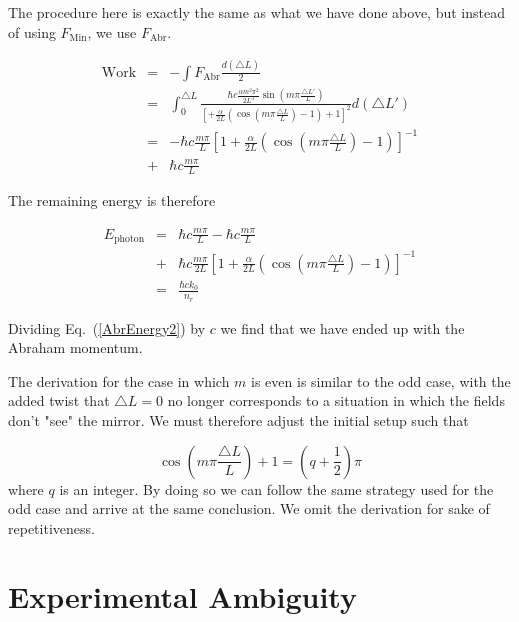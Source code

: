 \documentclass[twocolumn,english,pra,aps,superscriptaddress,floatfix]{revtex4-1}
\begin{document}
The procedure here is exactly the same as what we have done above, but instead of using $F_{\mathrm{Min}}$, we use $F_{\mathrm{Abr}}$.


\begin{eqnarray}
\mathrm{Work}&=&-\int F_{\mathrm{Abr}}\frac{d\left(\triangle L\right)}{2}\nonumber \\
&=&\int_{0}^{\triangle L}\frac{\hbar c\frac{\alpha m^{2}\pi^{2}}{2L^{3}}\sin(m\pi\frac{\triangle L'}{L})}{\left[+\frac{\alpha}{2L}\left(\cos(m\pi\frac{\triangle L}{L})-1\right)+1\right]^{2}}d\left(\triangle L'\right) \nonumber \\
&=&-\hbar c\frac{m\pi}{L}\left[1+\frac{\alpha}{2L}\left(\cos(m\pi\frac{\triangle L}{L})-1\right)\right]^{-1} \nonumber \\
&+&\hbar c\frac{m\pi}{L}
\label{AbrEnergy1}
\end{eqnarray}


The remaining energy is therefore

\begin{eqnarray}
E_{\mathrm{photon}}&=&\hbar c\frac{m\pi}{L} -\hbar c\frac{m\pi}{L}\nonumber \\
&+&\hbar c\frac{m\pi}{2L}\left[1+\frac{\alpha}{2L}\left(\cos(m\pi\frac{\triangle L}{L})-1\right)\right]^{-1}\nonumber \\
&=&\frac{\hbar ck_{0}}{n_{r}}
\label{AbrEnergy2}
\end{eqnarray}


Dividing Eq.\ (\ref{AbrEnergy2}) by $c$ we find that we have ended up with the Abraham momentum.

The derivation for the case in which $m$ is even is similar to the odd case, with the added twist that $\triangle L=0$ no longer corresponds to a situation in which the fields don't "see" the mirror.  We must therefore adjust the initial setup such that

\begin{equation}
\cos(m\pi\frac{\triangle L}{L})+1=(q+\frac{1}{2})\pi
\label{wavenumbereqn}
\end{equation}
where $q$ is an integer.  By doing so we can follow the same strategy used for the odd case and arrive at the same conclusion.  We omit the derivation for sake of repetitiveness.


\section{Experimental Ambiguity}
\label{sec:experiment}
\end{document}
